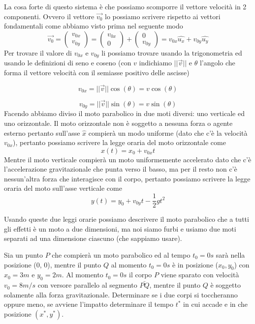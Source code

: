 \documentclass{rapport}
\begin{document}
La cosa forte di questo sistema è che possiamo scomporre il vettore velocità in 2 componenti. Ovvero il vettore $\vec{v_0}$ lo possiamo scrivere rispetto ai vettori fondamentali come abbiamo visto prima nel seguente modo 
\[
\vec{v_0} = \begin{pmatrix}
  v_{0x} \\
  v_{0y} 
\end{pmatrix} = \begin{pmatrix}
  v_{0x} \\
  0 
\end{pmatrix}+\begin{pmatrix}
  0 \\
  v_{0y} 
\end{pmatrix} = v_{0x}\hat{u_x} +v_{0y}\hat{u_y} 
\]  
Per trovare il valore di $v_{0x}$ e $v_{0y}$ li possiamo trovare usando la trigonometria ed usando le definizioni di seno e coseno (con $v$ indichiamo $||\vec{v}||$ e $\theta$ l'angolo che forma il vettore velocità con il semiasse positivo delle ascisse)

\[
v_{0x} = ||\vec{v}|| \cos(\theta) = v\cos(\theta)
\]

\[
v_{0y} = ||\vec{v}|| \sin(\theta) = v\sin(\theta)
\]
Facendo abbiamo diviso il moto parabolico in due moti diversi: uno verticale ed uno orizzontale. Il moto orizzontale non è soggetto a nessuna forza o agente esterno pertanto sull'asse $\hat{x}$ compierà un modo uniforme (dato che c'è la velocità $v_{0x}$), pertanto possiamo scrivere la legge oraria del moto orizzontale come 
\[
x(t) = x_0 + v_{0x}t
\]
Mentre il moto verticale compierà un moto uniformemente accelerato dato che c'è l'accelerazione gravitazionale che punta verso il basso, ma per il resto non c'è nessun'altra forza che interagisce con il corpo, pertanto possiamo scrivere la legge oraria del moto sull'asse verticale come 
\[
y(t) = y_0 + v_{0y} t - \dfrac{1}{2}gt^2
\]

Usando queste due leggi orarie possiamo descrivere il moto parabolico che  a tutti gli effetti è un moto a due dimensioni, ma noi siamo furbi e usiamo due moti separati ad una dimensione ciascuno (che sappiamo usare).

\begin{esercizio}{}{}
  Sia un punto $P$ che compierà un moto parabolico ed al tempo $t_0 = 0s$ sarà nella posizione (0, 0), mentre il punto $Q$ al momento $t_0=0s$ è in posizione ($x_0, y_0$) con $x_0= 3m$ e $y_0 = 2m$. Al momento $t_0 = 0s$ il corpo $P$ viene sparato con velocità $v_0 = 8m/s$ con versore parallelo al segmento $\bar{PQ}$, mentre il punto $Q$ è soggetto solamente alla forza gravitazionale. Determinare se i due corpi si toccheranno oppure meno, se avviene l'impatto determinare il tempo $t^*$ in cui accade e in che posizione $(x^*, y^*)$. 
\end{esercizio}
\end{document}
